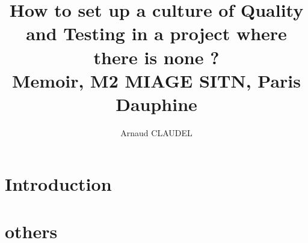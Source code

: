 \documentclass{report}
\title{
How to set up a culture of Quality and Testing in a project where there is none ?
\\ {\large Memoir, M2 MIAGE SITN, Paris Dauphine}}
\author{Arnaud CLAUDEL}
\begin{document}
    \maketitle
    \tableofcontents
    \chapter{Introduction}\label{ch:introduction}
    
    \chapter{others}\label{ch:others}
\end{document}
